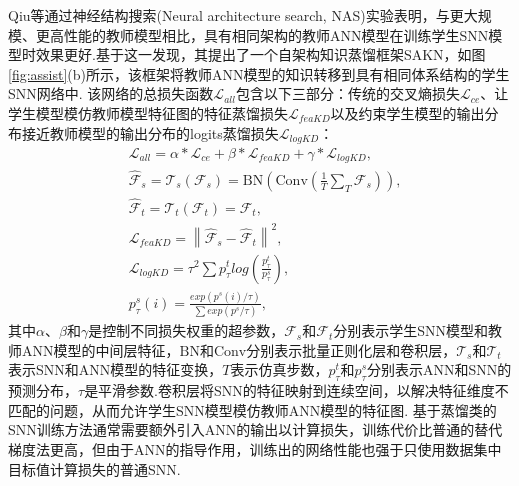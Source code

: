\documentclass{SCIS2020cn}
\begin{document}
Qiu等\cite{qiu2024self}通过神经结构搜索(Neural architecture search, NAS)实验表明，与更大规模、更高性能的教师模型相比，具有相同架构的教师ANN模型在训练学生SNN模型时效果更好.基于这一发现，其提出了一个自架构知识蒸馏框架SAKN，如图\ref{fig:assist}(b)所示，该框架将教师ANN模型的知识转移到具有相同体系结构的学生SNN网络中.
该网络的总损失函数$\mathcal{L}_{all}$包含以下三部分：传统的交叉熵损失$\mathcal{L}_{ce}$、让学生模型模仿教师模型特征图的特征蒸馏损失$\mathcal{L}_{feaKD}$以及约束学生模型的输出分布接近教师模型的输出分布的logits蒸馏损失$\mathcal{L}_{logKD}$：
\begin{align}
&\mathcal{L}_{all}=\alpha*\mathcal{L}_{ce}+\beta*\mathcal{L}_{feaKD}+\gamma*\mathcal{L}_{logKD}, \\
&\hat{\mathcal{F}}_s=\mathcal{T}_s(\mathcal{F}_s)=\text{BN}(\text{Conv}(\frac{1}{T}\sum_T{\mathcal{F}_s})), \\
&\hat{\mathcal{F}}_t=\mathcal{T}_t(\mathcal{F}_t)=\mathcal{F}_t, \\
&\mathcal{L}_{feaKD}=\left\|\hat{\mathcal{F}}_s-\hat{\mathcal{F}}_t\right\|^2,\\
&\mathcal{L}_{logKD}=\tau^2\sum{p_{\tau}^tlog(\frac{p^t_{\tau}}{p^s_{\tau}})}, \\ &p^s_{\tau}(i)=\frac{exp(p^s(i)/\tau)}{\sum exp(p^s/\tau)},
\end{align}
其中$\alpha$、$\beta$和$\gamma$是控制不同损失权重的超参数，$\mathcal{F}_s$和$\mathcal{F}_t$分别表示学生SNN模型和教师ANN模型的中间层特征，$\text{BN}$和$\text{Conv}$分别表示批量正则化层和卷积层，$\mathcal{T}_s$和$\mathcal{T}_t$表示SNN和ANN模型的特征变换，$T$表示仿真步数，$p^t_{\tau}$和$p^s_{\tau}$分别表示ANN和SNN的预测分布，$\tau$是平滑参数.卷积层将SNN的特征映射到连续空间，以解决特征维度不匹配的问题，从而允许学生SNN模型模仿教师ANN模型的特征图. 基于蒸馏类的SNN训练方法通常需要额外引入ANN的输出以计算损失，训练代价比普通的替代梯度法更高，但由于ANN的指导作用，训练出的网络性能也强于只使用数据集中目标值计算损失的普通SNN.





\end{document}
